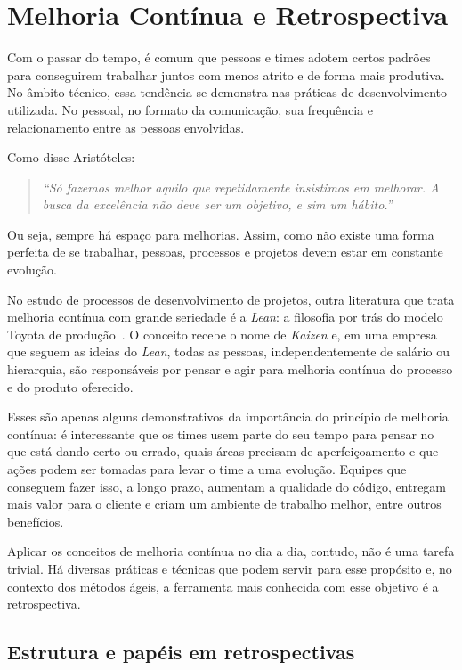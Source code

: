\section{Melhoria Contínua e Retrospectiva}

Com o passar do tempo, é comum que pessoas e times adotem certos padrões para conseguirem trabalhar juntos com menos atrito e de forma mais produtiva. No âmbito técnico, essa tendência se demonstra nas práticas de desenvolvimento utilizada. No pessoal, no formato da comunicação, sua frequência e relacionamento entre as pessoas envolvidas.

Como disse Aristóteles: 

\begin{quote}
\textit{``Só fazemos melhor aquilo que repetidamente insistimos em melhorar. A busca da excelência não deve ser um objetivo, e sim um hábito.''}
\end{quote}

Ou seja, sempre há espaço para melhorias. Assim, como não existe uma forma perfeita de se trabalhar, pessoas, processos e projetos devem estar em constante evolução.

No estudo de processos de desenvolvimento de projetos, outra literatura que trata melhoria contínua com grande seriedade é a \textit{Lean}: a filosofia por trás do modelo Toyota de produção~\cite{lean}. O conceito recebe o nome de \textit{Kaizen} e, em uma empresa que seguem as ideias do \textit{Lean}, todas as pessoas, independentemente de salário ou hierarquia, são responsáveis por pensar e agir para melhoria contínua do processo e do produto oferecido.

Esses são apenas alguns demonstrativos da importância do princípio de melhoria contínua: é interessante que os times usem parte do seu tempo para pensar no que está dando certo ou errado, quais áreas precisam de aperfeiçoamento e que ações podem ser tomadas para levar o time a uma evolução. Equipes que conseguem fazer isso, a longo prazo, aumentam a qualidade do código, entregam mais valor para o cliente e criam um ambiente de trabalho melhor, entre outros benefícios.

Aplicar os conceitos de melhoria contínua no dia a dia, contudo, não é uma tarefa trivial. Há diversas práticas e técnicas que podem servir para esse propósito e, no contexto dos métodos ágeis, a ferramenta mais conhecida com esse objetivo é a retrospectiva.

\subsection{Estrutura e papéis em retrospectivas}


